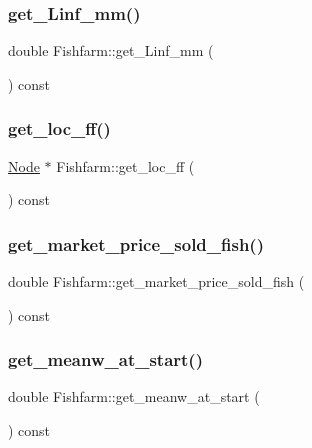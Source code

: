 \mbox{\label{class_fishfarm_ac38c90c5b54df288a239a6644b96b5d3}} 
\subsubsection{\texorpdfstring{get\_Linf\_mm()}{get\_Linf\_mm()}}
{\footnotesize\ttfamily double Fishfarm\+::get\+\_\+\+Linf\+\_\+mm (\begin{DoxyParamCaption}{ }\end{DoxyParamCaption}) const}

\mbox{\label{class_fishfarm_ad2e9367523994f7521a47c1333a9f61d}} 
\subsubsection{\texorpdfstring{get\_loc\_ff()}{get\_loc\_ff()}}
{\footnotesize\ttfamily \mbox{\hyperlink{class_node}{Node}} $\ast$ Fishfarm\+::get\+\_\+loc\+\_\+ff (\begin{DoxyParamCaption}{ }\end{DoxyParamCaption}) const}

\mbox{\label{class_fishfarm_a4a78d278c4acc527c4212833e89bbbda}} 
\subsubsection{\texorpdfstring{get\_market\_price\_sold\_fish()}{get\_market\_price\_sold\_fish()}}
{\footnotesize\ttfamily double Fishfarm\+::get\+\_\+market\+\_\+price\+\_\+sold\+\_\+fish (\begin{DoxyParamCaption}{ }\end{DoxyParamCaption}) const}

\mbox{\label{class_fishfarm_ac897666f45d54e4e9afb8a8d9219e642}} 
\subsubsection{\texorpdfstring{get\_meanw\_at\_start()}{get\_meanw\_at\_start()}}
{\footnotesize\ttfamily double Fishfarm\+::get\+\_\+meanw\+\_\+at\+\_\+start (\begin{DoxyParamCaption}{ }\end{DoxyParamCaption}) const}

